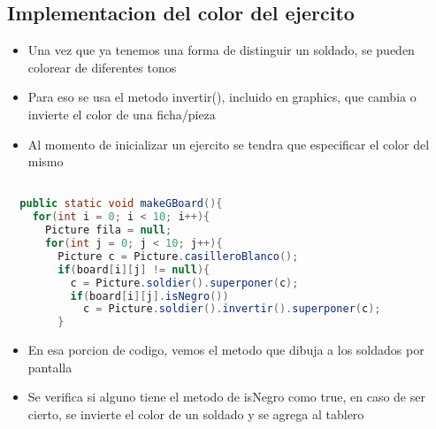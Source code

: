 \subsection{Implementacion del color del ejercito}
\begin{itemize}
  \item Una vez que ya tenemos una forma de distinguir un soldado, se pueden colorear de diferentes tonos
  \item Para eso se usa el metodo invertir(), incluido en graphics, que cambia o invierte el color de una ficha/pieza
  \item Al momento de inicializar un ejercito se tendra que especificar el color del mismo
\end{itemize}
\begin{lstlisting}[language=java, caption={Codigo fuente, Videojuego.java}]

  public static void makeGBoard(){
    for(int i = 0; i < 10; i++){
      Picture fila = null;
      for(int j = 0; j < 10; j++){
        Picture c = Picture.casilleroBlanco();
        if(board[i][j] != null){
          c = Picture.soldier().superponer(c);
          if(board[i][j].isNegro())
            c = Picture.soldier().invertir().superponer(c);
        }
\end{lstlisting}
\begin{itemize}
  \item En esa porcion de codigo, vemos el metodo que dibuja a los soldados por pantalla
  \item Se verifica si alguno tiene el metodo de isNegro como true, en caso de ser cierto, se invierte el color de un soldado y se agrega al tablero
\end{itemize}

